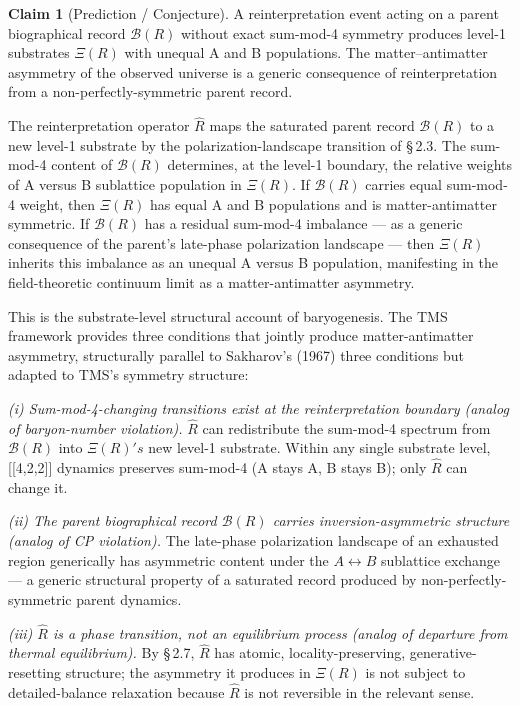 \documentclass[11pt,oneside]{report}
\theoremstyle{definition}
\newtheorem{claim}[theorem]{Claim}
\theoremstyle{remark}
\begin{document}
\begin{claim}[Prediction / Conjecture]
A reinterpretation
event acting on a parent biographical record \ensuremath{\mathcal{B}(R)} without exact
sum-mod-4 symmetry produces level-1 substrates \ensuremath{\Xi (R)} with unequal A and B
populations. The matter--antimatter asymmetry of the observed universe
is a generic consequence of reinterpretation from a
non-perfectly-symmetric parent record.
\end{claim}

The reinterpretation operator \ensuremath{\hat{R}} maps the saturated parent record \ensuremath{\mathcal{B}(R)} to
a new level-1 substrate by the polarization-landscape transition of
\S\,2.3. The sum-mod-4 content of \ensuremath{\mathcal{B}(R)} determines, at the level-1 boundary,
the relative weights of A versus B sublattice population in \ensuremath{\Xi (R).} If
\ensuremath{\mathcal{B}(R)} carries equal sum-mod-4 weight, then \ensuremath{\Xi (R)} has equal A and B
populations and is matter-antimatter symmetric. If \ensuremath{\mathcal{B}(R)} has a residual
sum-mod-4 imbalance --- as a generic consequence of the parent's
late-phase polarization landscape --- then \ensuremath{\Xi (R)} inherits this imbalance
as an unequal A versus B population, manifesting in the field-theoretic
continuum limit as a matter-antimatter asymmetry.

This is the substrate-level structural account of baryogenesis. The TMS
framework provides three conditions that jointly produce
matter-antimatter asymmetry, structurally parallel to Sakharov's (1967)
three conditions but adapted to TMS's symmetry structure:

\emph{(i) Sum-mod-4-changing transitions exist at the reinterpretation
boundary (analog of baryon-number violation).} \ensuremath{\hat{R}} can redistribute the
sum-mod-4 spectrum from \ensuremath{\mathcal{B}(R)} into \ensuremath{\Xi (R)'s} new level-1 substrate. Within
any single substrate level, [[4,2,2]] dynamics preserves
sum-mod-4 (A stays A, B stays B); only \ensuremath{\hat{R}} can change it.

\emph{(ii) The parent biographical record \ensuremath{\mathcal{B}(R)} carries
inversion-asymmetric structure (analog of CP violation).} The late-phase
polarization landscape of an exhausted region generically has asymmetric
content under the \ensuremath{A\leftrightarrow B} sublattice exchange --- a generic structural
property of a saturated record produced by non-perfectly-symmetric
parent dynamics.

\emph{(iii) \ensuremath{\hat{R}} is a phase transition, not an equilibrium process (analog
of departure from thermal equilibrium).} By \S\,2.7, \ensuremath{\hat{R}} has atomic,
locality-preserving, generative-resetting structure; the asymmetry it
produces in \ensuremath{\Xi (R)} is not subject to detailed-balance relaxation because \ensuremath{\hat{R}}
is not reversible in the relevant sense.
\end{document}
